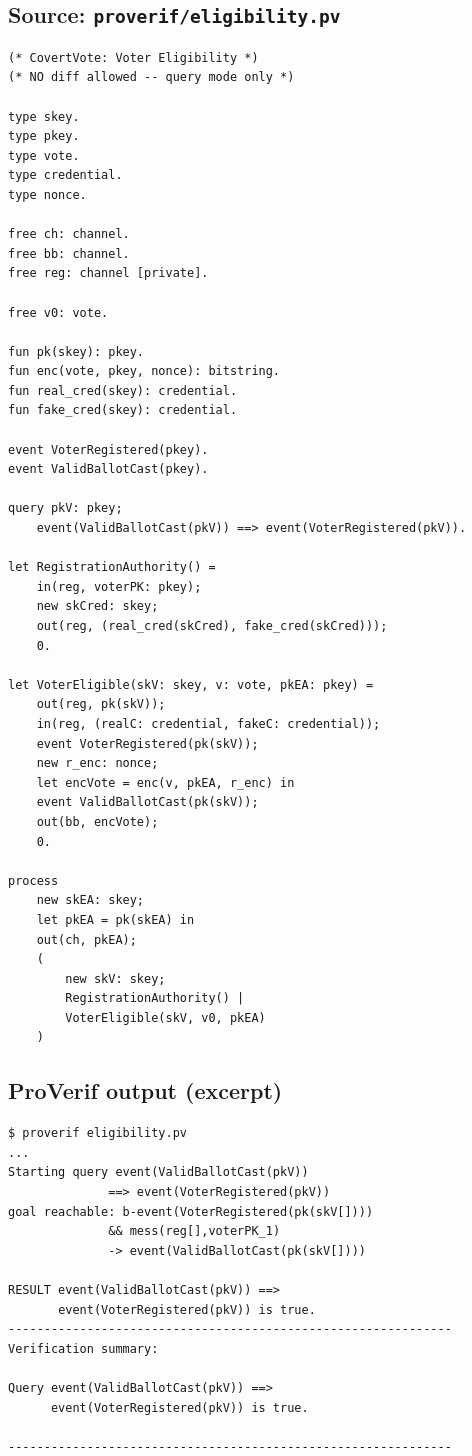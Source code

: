 \subsection*{Source: \texttt{proverif/eligibility.pv}}
\begin{footnotesize}
\begin{verbatim}
(* CovertVote: Voter Eligibility *)
(* NO diff allowed -- query mode only *)

type skey.
type pkey.
type vote.
type credential.
type nonce.

free ch: channel.
free bb: channel.
free reg: channel [private].

free v0: vote.

fun pk(skey): pkey.
fun enc(vote, pkey, nonce): bitstring.
fun real_cred(skey): credential.
fun fake_cred(skey): credential.

event VoterRegistered(pkey).
event ValidBallotCast(pkey).

query pkV: pkey;
    event(ValidBallotCast(pkV)) ==> event(VoterRegistered(pkV)).

let RegistrationAuthority() =
    in(reg, voterPK: pkey);
    new skCred: skey;
    out(reg, (real_cred(skCred), fake_cred(skCred)));
    0.

let VoterEligible(skV: skey, v: vote, pkEA: pkey) =
    out(reg, pk(skV));
    in(reg, (realC: credential, fakeC: credential));
    event VoterRegistered(pk(skV));
    new r_enc: nonce;
    let encVote = enc(v, pkEA, r_enc) in
    event ValidBallotCast(pk(skV));
    out(bb, encVote);
    0.

process
    new skEA: skey;
    let pkEA = pk(skEA) in
    out(ch, pkEA);
    (
        new skV: skey;
        RegistrationAuthority() |
        VoterEligible(skV, v0, pkEA)
    )
\end{verbatim}
\end{footnotesize}

\subsection*{ProVerif output (excerpt)}
\begin{footnotesize}
\begin{verbatim}
$ proverif eligibility.pv
...
Starting query event(ValidBallotCast(pkV))
              ==> event(VoterRegistered(pkV))
goal reachable: b-event(VoterRegistered(pk(skV[])))
              && mess(reg[],voterPK_1)
              -> event(ValidBallotCast(pk(skV[])))

RESULT event(ValidBallotCast(pkV)) ==>
       event(VoterRegistered(pkV)) is true.
--------------------------------------------------------------
Verification summary:

Query event(ValidBallotCast(pkV)) ==>
      event(VoterRegistered(pkV)) is true.

--------------------------------------------------------------
\end{verbatim}
\end{footnotesize}

